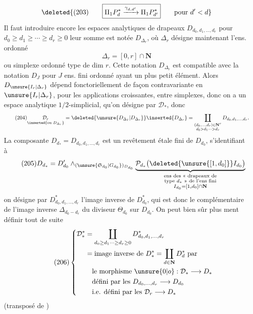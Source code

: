 \[
\deleted{(203)\qquad\boxed{\Pi_1P_d^*\xrightarrow{\gamma_{d,d'}}\Pi_1P_{d'}^*}\qquad\text{pour }d'<d}
\]
Il faut introduire encore les espaces analytiques
de drapeaux $D_{d_0,d_1,\ldots,d_r}$ pour $d_0\geq d_1\geq\cdots\geq d_r\geq0$
leur somme est notée $D_{\Delta_r}$, où $\Delta_r$ désigne
maintenant l'ens. ordonné
\[
\tag{203}\Delta_r=[0,r]\cap\mathbf N
\]
ou simplexe ordonné type de dim $r$. Cette notation
$D_{\Delta_r}$ est compatible avec la notation $D_J$ pour $J$
ens. fini ordonné ayant un plus petit élément.
Alors $D_{\unsure{I_r|\Delta_r}}$ dépend fonctoriellement de façon
contravariante en $\unsure{I_r|\Delta_r}$, pour les applications
croissantes, entre simplexes, donc on a un
espace analytique $1/2$-simplicial, qu'on désigne par
$\mathcal D_*$, donc
\[
\tag{204}
\underset{\inserted{\text{ou }D_{\Delta_r}}}{\mathcal D_r}
=\deleted{\unsure{D_{\Delta_I}|D_{\Delta_r}}}\inserted{D_{\Delta_r}}
=\coprod_{\substack{(d_0,\ldots,d_r)\in\mathbf N^r\\d_0>d_1\cdots>d_r}}
D_{d_0,d_1,\ldots,d_r}.
\]
La composante $D_{d_*}=D_{d_0,d_1,\ldots,d_r}$ est
un revêtement étale fini de $D_{d_0}$, s'identifiant
à
\[
\tag{205}
D_{d_*}=D'_{d_0}\wedge_{(\unsure{\mathfrak S_{d_0}|G_{d_0}})_{D_{d_0}}}
\underbrace{\mathcal P_{d_*}\bigl(\deleted{\unsure{[1,d_0]}}I_{d_0}\bigr)}_{
\substack{\text{ens des « drapeaux de}\\
\text{type }d_*\text{ » de l'ens fini}\\I_{d_0}=[1,d_0]\cap\mathbf N}}
\]
on désigne par $D^*_{d_0,d_1,\ldots,d_r}$ l'image inverse
de $D^*_{d_0}$, qui est donc le complémentaire
de l'image inverse $\Delta_{d_0- d_r}$ du diviseur
$\Theta_{d_0}$ sur $D_{d_0}$. On peut bien sûr plus 
ment définir tout de suite
\[
\tag{206}
\left\{\begin{aligned}
\mathcal D_*^*&=\coprod_{d_0\geq d_1\cdots\geq d_r\geq0}D^*_{d_0,d_1,\ldots,d_r}\\
&=\text{image inverse de }D_*^*=\coprod_{d\in\mathbf N}D_d^*\text{ par}\\
&\quad\text{le morphisme }\unsure{0|o}:\mathcal D_*\longrightarrow D_*\\
&\quad\text{défini par les }D_{d_0,\ldots,d_r}\longrightarrow D_{d_0}\\
&\quad\text{i.e. défini par les }\mathcal D_r\longrightarrow D_*
\end{aligned}\right.
\]
(transposé de
)

